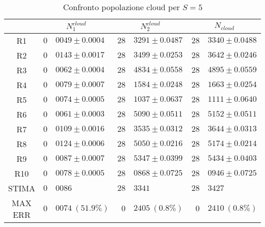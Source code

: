 \begin{table}[!h]
\begin{tabular}{c|r@{.}l|r@{.}l|r@{.}l}
& \multicolumn{2}{|c|}{$N_1^{cloud}$}
& \multicolumn{2}{|c|}{$N_2^{cloud}$}
& \multicolumn{2}{|c}{$N_{cloud}$} 
\\          
\hline
R1      & $0$&$0049 \pm 0.0004$ & $28$&$3291 \pm 0.0487$ & $28$&$3340 \pm 0.0488$ \\
R2      & $0$&$0143 \pm 0.0017$ & $28$&$3499 \pm 0.0253$ & $28$&$3642 \pm 0.0246$ \\
R3      & $0$&$0062 \pm 0.0004$ & $28$&$4834 \pm 0.0558$ & $28$&$4895 \pm 0.0559$ \\
R4      & $0$&$0079 \pm 0.0007$ & $28$&$1584 \pm 0.0248$ & $28$&$1663 \pm 0.0254$ \\
R5      & $0$&$0074 \pm 0.0005$ & $28$&$1037 \pm 0.0637$ & $28$&$1111 \pm 0.0640$ \\
R6      & $0$&$0061 \pm 0.0003$ & $28$&$5090 \pm 0.0511$ & $28$&$5152 \pm 0.0511$ \\
R7      & $0$&$0109 \pm 0.0016$ & $28$&$3535 \pm 0.0312$ & $28$&$3644 \pm 0.0313$ \\
R8      & $0$&$0124 \pm 0.0006$ & $28$&$5050 \pm 0.0216$ & $28$&$5174 \pm 0.0214$ \\
R9      & $0$&$0087 \pm 0.0007$ & $28$&$5347 \pm 0.0399$ & $28$&$5434 \pm 0.0403$ \\
R10     & $0$&$0078 \pm 0.0005$ & $28$&$0868 \pm 0.0725$ & $28$&$0946 \pm 0.0725$ \\
STIMA   & $0$&$0086$            & $28$&$3341$            & $28$&$3427$            \\
MAX ERR & $0$&$0074 \ (51.9\%)$ & $0$&$2405 \ (0.8\%)$   & $0$&$2410 \ (0.8\%)$     
\end{tabular}
\centering
\caption{Confronto popolazione cloud per $S=5$}
\label{tab:5_ncloud}
\end{table}
